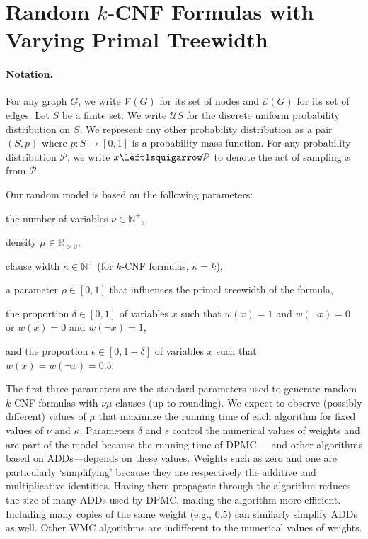 \documentclass[letterpaper]{article} %
\theoremstyle{definition}
\theoremstyle{remark}
\begin{document}
\section{Random $k$-CNF Formulas with Varying Primal
  Treewidth}\label{sec:model}

\paragraph{Notation.}
For any graph $G$, we write $\mathcal{V}(G)$ for its set of nodes and
$\mathcal{E}(G)$ for its set of edges. Let $S$ be a finite set. We write
$\mathcal{U}S$ for the discrete uniform probability distribution on $S$. We
represent any other probability distribution as a pair $(S, p)$ where $p\colon S
\to [0, 1]$ is a probability mass function. For any probability distribution
$\mathcal{P}$, we write $x \leftlsquigarrow \mathcal{P}$ to denote the act of
sampling $x$ from $\mathcal{P}$.

Our random model is based on the following parameters:
\begin{itemize*}
\item the number of variables $\nu \in \mathbb{N}^+$,
\item density $\mu \in \mathbb{R}_{>0}$,
\item clause width $\kappa \in \mathbb{N}^+$ (for $k$-CNF formulas, $\kappa =
  k$),
\item a parameter $\rho \in [0, 1]$ that influences the primal treewidth of
  the formula,
\item the proportion $\delta \in [0, 1]$ of variables $x$ such that $w(x) = 1$
  and $w(\neg x) = 0$ or $w(x) = 0$ and $w(\neg x) = 1$,
\item and the proportion $\epsilon \in [0, 1-\delta]$ of variables $x$ such that
  $w(x) = w(\neg x) = 0.5$.
\end{itemize*}
The first three parameters are the standard parameters used to generate random
$k$-CNF formulas with $\nu\mu$ clauses (up to rounding). We expect to observe
(possibly different) values of $\mu$ that maximize the running time of each
algorithm for fixed values of $\nu$ and $\kappa$. Parameters $\delta$ and
$\epsilon$ control the numerical values of weights and are part of the model
because the running time of \textsc{DPMC}~\cite{DBLP:conf/cp/DudekPV20}---and
other algorithms based on ADDs---depends on these values. Weights such as zero
and one are particularly `simplifying' because they are respectively the
additive and multiplicative identities. Having them propagate through the
algorithm reduces the size of many ADDs used by \textsc{DPMC}, making the
algorithm more efficient. Including many copies of the same weight (e.g., 0.5)
can similarly simplify ADDs as well. Other \textsf{WMC} algorithms are
indifferent to the numerical values of weights.
\end{document}
